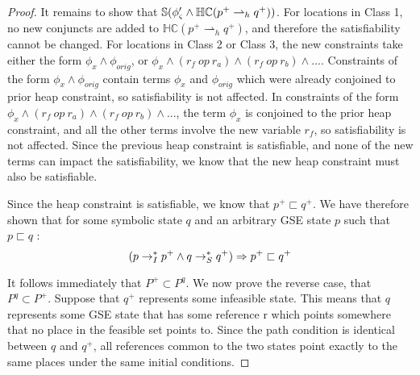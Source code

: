 \begin{proof}
It remains to show that $\mathbb{S}( \phi_{\varsigma}^\prime \wedge \mathbb{HC}(p^+ \rightharpoonup_{h} q^+) )$. For locations in Class 1, no new conjuncts are added to $\mathbb{HC}(p^+ \rightharpoonup_{h} q^+)$, and therefore the satisfiability cannot be changed. For locations in Class 2 or Class 3, the new constraints take either the form $\phi_x \wedge \phi_\mathit{orig}$, or $\phi_x \wedge (r_f\ op\ r_{a}) \wedge (r_f\ op\ r_{b}) \wedge ...$. Constraints of the form  $\phi_x \wedge \phi_\mathit{orig}$ contain terms $\phi_x$ and $\phi_\mathit{orig}$ which were already conjoined to prior heap constraint, so satisfiability is not affected. In constraints of the form $\phi_x \wedge (r_f\ op\ r_{a}) \wedge (r_f\ op\ r_{b}) \wedge ...$, the term $\phi_x$ is conjoined to the prior heap constraint, and all the other terms involve the new variable $r_f$, so satisfiability is not affected. Since the previous heap constraint is satisfiable, and none of the new terms can impact the satisfiability, we know that the new heap constraint must also be satisfiable.

Since the heap constraint is satisfiable, we know that $p^+ \sqsubset q^+ $. We have therefore shown that for some symbolic state ${q}$ and an arbitrary GSE state $p$ such that $p \sqsubset {q}$ :
\begin{equation} 
(p \rightarrow_I^* p^+ \wedge {q} \rightarrow_S^* q^+) \Rightarrow p^+ \sqsubset q^+ 
\end{equation}

It follows immediately that $P^+ \subset P^q$. We now prove the reverse case, that $P^q \subset P^+$. Suppose that $q^+$ represents some infeasible state. This means that $q$ represents some GSE state that has some reference r which points somewhere that no place in the feasible set points to. Since the path condition is identical between $q$ and $q^+$, all references common to the two states point exactly to the same places under the same initial conditions. 


\end{proof}
